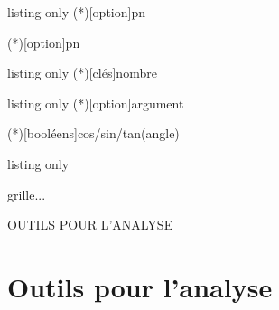 \documentclass[a4paper,french,11pt]{article}
\begin{document}
\begin{PresCodeTexPL}{listing only}
\Arrangement(*)[option]{p}{n}

\Combinaison(*)[option]{p}{n}
\end{PresCodeTexPL}

\begin{PresCodeTexPL}{listing only}
\ConversionDecBin(*)[clés]{nombre}


\end{PresCodeTexPL}

\begin{PresCodeTexPL}{listing only}
\ConversionFraction(*)[option]{argument}



\LigneTrigo(*)[booléens]{cos/sin/tan}(angle)
\end{PresCodeTexPL}

\begin{PresCodeTexPL}{listing only}
\begin{EnvSudoMaths}[options]{grille}...\end{EnvSudoMaths}
\end{PresCodeTexPL}

\newpage

\phantom{t}\par\vfill\par
\begin{PART}
	\begin{center}
		\Huge\MakeUppercase{Outils pour l'analyse}
	\end{center}
\end{PART}
\par\vfill\par\phantom{t}

\newpage

\part{Outils pour l'analyse}
\end{document}
